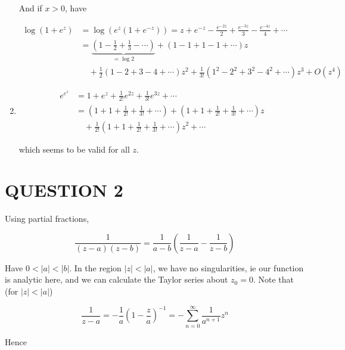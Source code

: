 \documentclass[a4paper]{article}
\begin{document}
\begin{enumerate}
	And if $ x > 0 $, have
	
		
	\begin{align*} \log(1+e^{z})  & = \log(e^{z}(1 + e^{-z})) = z + e^{-z} - \frac{e^{-2z}}{2} + \frac{e^{-3z}}{3} - \frac{e^{-4z}}{4} + \cdots   \\
	& = \underbrace{\left(  1 - \frac{1}{2} + \frac{1}{3} - \cdots \right)}_{= \log 2} + \left( 1 - 1 + 1 - 1 + \cdots \right) z  \\
	& \quad + \frac{1}{2}\left( 1 - 2 + 3 - 4 + \cdots   \right) z^{2} + \frac{1}{3!} \left( 1^{2} - 2^{2} + 3^{2} - 4^{2} +  \cdots   \right) z^{3} +  O(z^{4}) 
	\end{align*}
	
	
	
	
	\item \begin{align*}
	e^{e^{z}} & = 1 + e^{z} +  \frac{1}{2!}e^{2z}+ \frac{1}{3!}  e^{3z} + \cdots \\
	& = \left(  1 + 1 + \frac{1}{2!} + \frac{1}{3!} + \cdots \right)  + \left(  1 + 1 + \frac{1}{2!} + \frac{1}{3!} + \cdots \right) z \\
	& \quad + \frac{1}{2!} \left(  1 + 1 + \frac{1}{2!} + \frac{1}{3!} + \cdots \right)z^{2} + \cdots
	\end{align*}
	
	which seems to be valid for all $ z $.  
	
\end{enumerate}









\section{QUESTION 2}


Using partial fractions,

\[ \frac{1}{(z-a)(z-b)} = \frac{1}{a-b} \left(   \frac{1}{z-a} - \frac{1}{z - b} \right)  \]


Have $ 0 < | a | < | b | $. In the region $ | z | < | a | $, we have no singularities,  ie our function is analytic here, and we can calculate the  Taylor series about $ z_{0} = 0 $. Note that (for $ | z | < | a | $)

\[ \frac{1}{z - a} = - \frac{1}{a} \left(  1 - \frac{z}{a} \right)^{-1} = - \sum_{n=0}^{\infty} \frac{1}{a^{n+1}} z^{n}  \]


Hence 
\end{document}
